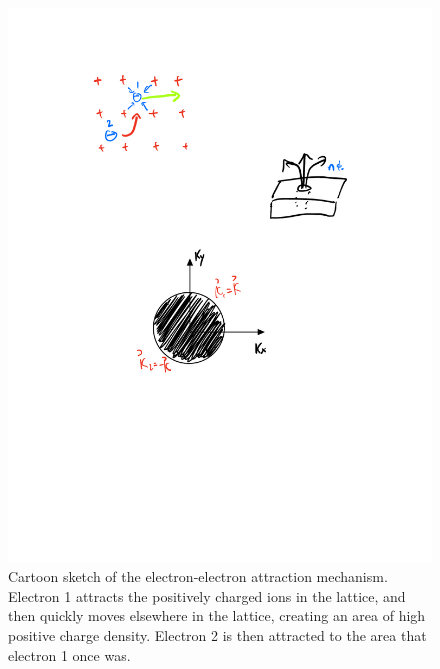 \begin{figure}[htbp]
    \centering
    \includegraphics[scale=0.8]{Images/fig-electronattractionsketch.pdf}
    \caption{Cartoon sketch of the electron-electron attraction mechanism. Electron 1 attracts the positively charged ions in the lattice, and then quickly moves elsewhere in the lattice, creating an area of high positive charge density. Electron 2 is then attracted to the area that electron 1 once was.}
    \label{fig-electronattractionsketch}
\end{figure}